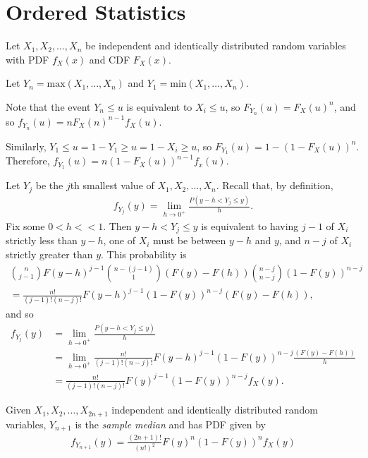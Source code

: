\section{Ordered Statistics}

Let $X_1, X_2, \ldots, X_n$ be independent and identically distributed random variables with PDF $f_X(x)$ and CDF $F_X(x)$.

Let $Y_n = \mathrm{max}(X_1, \ldots, X_n)$ and $Y_1 = \mathrm{min}(X_1, \ldots, X_n)$.

Note that the event $Y_n \leq u$ is equivalent to $X_i \leq u$, so $F_{Y_n}(u) = F_X(u)^{n}$, and so $f_{Y_n}(u) = nF_X(n)^{n-1}f_X(u)$.

Similarly, $Y_1 \leq u = 1 - Y_1 \geq u = 1 - X_i \geq u$, so $F_{Y_1}(u) = 1 - \left(1 - F_X(u)\right)^{n}$. Therefore, $f_{Y_1}(u) = n\left(1-F_X(u)\right)^{n-1}f_x(u)$.

Let $Y_j$ be the $j$th smallest value of $X_1, X_2, \ldots, X_n$. Recall that, by definition,
\begin{align*}
    f_{Y_j}(y) = \lim_{h \to 0^{+}}\frac{P(y-h < Y_j \leq y)}{h}.
\end{align*}
Fix some $0 < h << 1$. Then $y-h < Y_j \leq y$ is equivalent to having $j-1$ of $X_i$ strictly less than $y-h$, one of $X_i$ must be between $y-h$ and $y$, and $n-j$ of $X_i$ strictly greater than $y$. This probability is
\begin{align*}
    \binom{n}{j-1}F(y-h)^{j-1}\binom{n-(j-1)}{1}\left(F(y)-F(h)\right)\binom{n-j}{n-j}\left(1-F(y)\right)^{n-j} \\
    = \frac{n!}{(j-1)!(n-j)!}F(y-h)^{j-1}\left(1-F(y)\right)^{n-j}\left(F(y)-F(h)\right),
\end{align*}
and so
\begin{align*}
    f_{Y_j}(y) &= \lim_{h \to 0^{+}}\frac{P(y-h<Y_j\leq y)}{h} \\
    &= \lim_{h \to 0^{+}}\frac{n!}{(j-1)!(n-j)!}F(y-h)^{j-1}\left(1-F(y)\right)^{n-j}\frac{\left(F(y)-F(h)\right)}{h} \\
    &= \frac{n!}{(j-1)!(n-j)!}F(y)^{j-1}\left(1-F(y)\right)^{n-j}f_X(y).
\end{align*}

\begin{defn}
    Given $X_1, X_2, \ldots, X_{2n+1}$ independent and identically distributed random variables, $Y_{n+1}$ is the \emph{sample median} and has PDF given by
    \begin{align*}
        f_{Y_{n+1}}(y) = \frac{(2n+1)!}{(n!)^2}F(y)^{n}\left(1-F(y)\right)^{n}f_X(y)
    \end{align*}
\end{defn}


